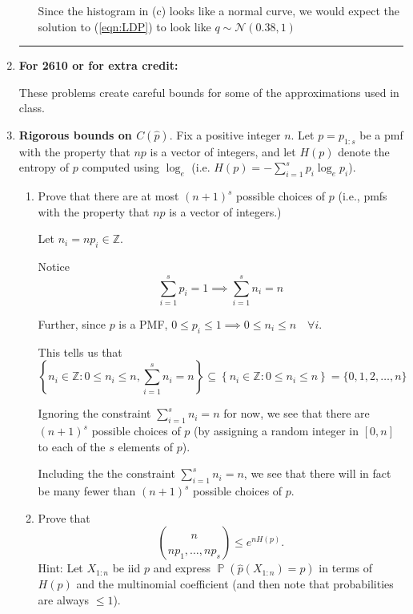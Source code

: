 \documentclass[12pt]{article}
\renewcommand{\hat}[1]{\widehat{#1}}
\newcommand{\Z}{\mathbb{Z}}
\newcommand{\sub}{\subseteq}
\newcommand*{\tbf}[1]{\ifmmode\mathbf{#1}\else\textbf{#1}\fi}
\DeclareMathOperator{\Prob}{\mathbb{P}}
\begin{document}
\begin{enumerate}[1.]
\begin{enumerate}[(a)]
		            \color{blue}
		            Since the histogram in (c) looks like a normal curve, we would expect the solution to (\ref{eqn:LDP}) to look like $q \sim \mathcal{N}(0.38, 1)$
		            \color{black}
	      \end{enumerate}

	      \medskip

	      \hrule

	      \medskip

	      \pagebreak

	\item[] \hspace{-3ex} {\bf For 2610 or for extra credit:}


	      \noindent These problems create careful bounds for some of the approximations used in class.

	\item {\tbf{Rigorous bounds on ${C(\hat{p})}$}.}
	      Fix a positive integer $n$. Let $p=p_{1:s}$ be a pmf with the property that $np$ is a vector of integers, and let $H(p)$ denote the entropy of $p$ computed using $\log_e$ (i.e. $H(p) = -\sum_{i=1}^s p_i \log_e p_i$).
	      \begin{enumerate}
		      \item Prove that there are at most $(n+1)^s$ possible choices of $p$ (i.e., pmfs with the property that $np$ is a vector of integers.)

		            \color{blue}
		            Let $n_i = np_i \in \Z$.

		            Notice
		            \[\sum_{i=1}^{s} p_i = 1 \implies \sum_{i=1}^s n_i = n\]

		            Further, since $p$ is a PMF, $0 \leq p_i \leq 1 \implies 0 \leq n_i \leq n \quad \forall i$.

		            This tells us that
		            \[\left\{n_i \in \Z: 0 \leq n_i \leq n, \sum_{i=1}^s n_i = n\right\} \sub \left\{n_i \in \Z: 0 \leq n_i \leq n\right\} = \{0, 1, 2, \dots, n\}\]

		            Ignoring the constraint $\sum_{i=1}^s n_i = n$ for now, we see that there are $(n+1)^s$ possible choices of $p$ (by assigning a random integer in $[0, n]$ to each of the $s$ elements of $p$).

		            Including the the constraint $\sum_{i=1}^s n_i = n$, we see that there will in fact be many fewer than $(n+1)^s$ possible choices of $p$.
		            \color{black}

		      \item  Prove that
		            \[ \binom{n}{np_1,\dotsc,np_s} \leq e^{nH(p)}  . \]
		            Hint: Let $X_{1:n}$ be iid $p$ and express $\Prob(\widehat p(X_{1:n})=p)$ in terms of $H(p)$ and the multinomial coefficient (and then note that probabilities are always $\leq 1$).


\end{enumerate}
\end{enumerate}
\end{document}
